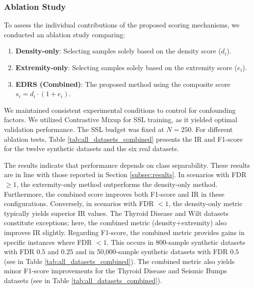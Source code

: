 \documentclass[preprint,12pt]{elsarticle}
\begin{document}
\subsubsection{Ablation Study}
To assess the individual contributions of the proposed scoring mechanisms, we conducted an ablation study comparing:
\begin{enumerate}
    \item \textbf{Density-only}: Selecting samples solely based on the density score ($d_i$).
    \item \textbf{Extremity-only}: Selecting samples solely based on the extremity score ($e_i$).
    \item \textbf{EDRS (Combined)}: The proposed method using the composite score $s_i = d_i \cdot (1 + e_i)$.
\end{enumerate}

We maintained consistent experimental conditions to control for confounding factors. We utilized Contrastive Mixup for SSL training, as it yielded optimal validation performance. The SSL budget was fixed at $N=250$. For different ablation tests, Table \ref{tab:all_datasets_combined} presents the IR and F1-score for the twelve synthetic datasets and the six real datasets.

The results indicate that performance depends on class separability. These results are in line with those reported in Section \ref{subsec:results}. In scenarios with FDR $\ge 1$, the extremity-only method outperforms the density-only method. Furthermore, the combined score improves both F1-score and IR in these configurations. Conversely, in scenarios with FDR $< 1$, the density-only metric typically yields superior IR values. The Thyroid Disease and Wilt datasets constitute exceptions; here, the combined metric (density+extremity) also improves IR slightly. Regarding F1-score, the combined metric provides gains in specific instances where FDR $< 1$. This occurs in 800-sample synthetic datasets with FDR $0.5$ and $0.25$ and in 50,000-sample synthetic datasets with FDR $0.5$ (see in Table \ref{tab:all_datasets_combined}). The combined metric also yields minor F1-score improvements for the Thyroid Disease and Seismic Bumps datasets (see in Table \ref{tab:all_datasets_combined}).
\end{document}
